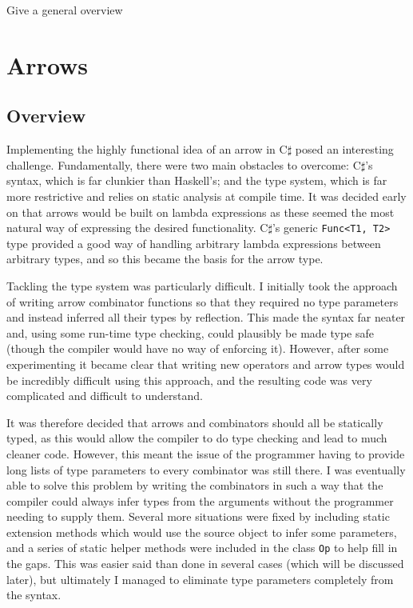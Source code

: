 \documentclass[12pt,twoside,notitlepage]{report}
\begin{document}
Give a general overview


\section{Arrows}

\subsection{Overview} \label{sec:arrows_overview}

Implementing the highly functional idea of an arrow in C$\sharp$ posed an interesting challenge. Fundamentally, there were two main obstacles to overcome: C$\sharp$'s syntax, which is far clunkier than Haskell's; and the type system, which is far more restrictive and relies on static analysis at compile time. It was decided early on that arrows would be built on lambda expressions as these seemed the most natural way of expressing the desired functionality. C$\sharp$'s generic \texttt{Func<T1, T2>} type provided a good way of handling arbitrary lambda expressions between arbitrary types, and so this became the basis for the arrow type.

Tackling the type system was particularly difficult. I initially took the approach of writing arrow combinator functions so that they required no type parameters and instead inferred all their types by reflection. This made the syntax far neater and, using some run-time type checking, could plausibly be made type safe (though the compiler would have no way of enforcing it). However, after some experimenting it became clear that writing new operators and arrow types would be incredibly difficult using this approach, and the resulting code was very complicated and difficult to understand.

It was therefore decided that arrows and combinators should all be statically typed, as this would allow the compiler to do type checking and lead to much cleaner code. However, this meant the issue of the programmer having to provide long lists of type parameters to every combinator was still there. I was eventually able to solve this problem by writing the combinators in such a way that the compiler could always infer types from the arguments without the programmer needing to supply them. Several more situations were fixed by including static extension methods which would use the source object to infer some parameters, and a series of static helper methods were included in the class \texttt{Op} to help fill in the gaps. This was easier said than done in several cases (which will be discussed later), but ultimately I managed to eliminate type parameters completely from the syntax.
\end{document}
